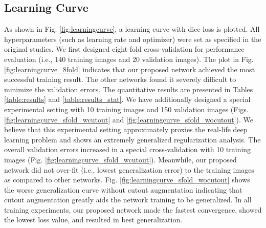 \documentclass[journal]{IEEEtran}
\begin{document}
        
        

\subsection{Learning Curve}
As shown in Fig. \ref{fig:learningcurve}, a learning curve with dice loss is plotted. All hyperparameters (such as learning rate and optimizer) were set as specified in the original studies. We first designed eight-fold cross-validation for performance evaluation (i.e., 140 training images and 20 validation images). The plot in Fig. \ref{fig:learningcurve_8fold} indicates that our proposed network achieved the most successful training result. The other networks found it severely difficult to minimize the validation errors. The quantitative results are presented in Tables \ref{table:results} and \ref{table:results_stat}. We have additionally designed a special experimental setting with 10 training images and 150 validation images (Figs. \ref{fig:learningcurve_sfold_wcutout} and \ref{fig:learningcurve_sfold_wocutout}). We believe that this experimental setting approximately proxies the real-life deep learning problem and shows an extremely generalized regularization analysis. The overall validation errors increased in a special cross-validation with 10 training images (Fig. \ref{fig:learningcurve_sfold_wcutout}). Meanwhile, our proposed network did not over-fit (i.e., lowest generalization error) to the training images as compared to other networks. Fig. \ref{fig:learningcurve_sfold_wocutout} shows the worse generalization curve without cutout augmentation \cite{devries2017improved} indicating that cutout augmentation greatly aids the network training to be generalized. In all training experiments, our proposed network made the fastest convergence, showed the lowest loss value, and resulted in best generalization.



        
\end{document}
